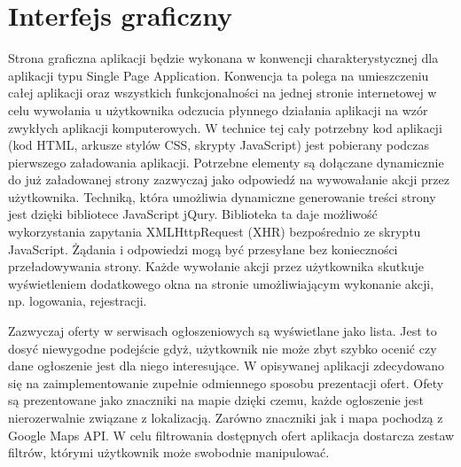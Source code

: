 \section{Interfejs graficzny}
\label{sec:interfejsGraficzny}

Strona graficzna aplikacji będzie wykonana w konwencji charakterystycznej dla aplikacji typu Single Page Application\cite{spa}. Konwencja ta polega na umieszczeniu całej aplikacji oraz wszystkich funkcjonalności na jednej stronie internetowej w celu wywołania u użytkownika odczucia płynnego działania aplikacji na wzór zwykłych aplikacji komputerowych. W technice tej cały potrzebny kod aplikacji (kod HTML, arkusze stylów CSS, skrypty JavaScript) jest pobierany podczas pierwszego załadowania aplikacji. Potrzebne elementy są dołączane dynamicznie do już załadowanej strony zazwyczaj jako odpowiedź na wywowałanie akcji przez użytkownika. Techniką, która umożliwia dynamiczne generowanie treści strony jest dzięki bibliotece JavaScript jQury. Biblioteka ta daje możliwość wykorzystania zapytania XMLHttpRequest (XHR) bezpośrednio ze skryptu JavaScript. Żądania i odpowiedzi mogą być przesyłane bez konieczności przeładowywania strony. Każde wywołanie akcji przez użytkownika skutkuje wyświetleniem dodatkowego okna na stronie umożliwiającym wykonanie akcji, np. logowania, rejestracji.

Zazwyczaj oferty w serwisach ogłoszeniowych są wyświetlane jako lista. Jest to dosyć niewygodne podejście gdyż, użytkownik nie może zbyt szybko ocenić czy dane ogłoszenie jest dla niego interesujące. W opisywanej aplikacji zdecydowano się na zaimplementowanie zupełnie odmiennego sposobu prezentacji ofert. Ofety są prezentowane jako znaczniki na mapie dzięki czemu, każde ogłoszenie jest nierozerwalnie związane z lokalizacją. Zarówno znaczniki jak i mapa pochodzą z Google Maps API. W celu filtrowania dostępnych ofert aplikacja dostarcza zestaw filtrów, którymi użytkownik może swobodnie manipulować. 


